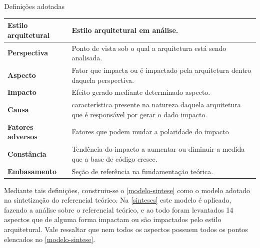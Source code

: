 \begin{quadro}
    \caption{Definições adotadas\label{quad:sintese-definicoes}}
    \begin{tabularx}{\linewidth}{ | p{5cm} | X | }
    \hline
    \textbf{Estilo arquitetural} & Estilo arquitetural em análise. \\ \hline
    \textbf{Perspectiva}         & Ponto de vista sob o qual a arquitetura está sendo analisada. \\ \hline
    \textbf{Aspecto}             & Fator que impacta ou é impactado pela arquitetura dentro daquela perspectiva. \\ \hline
    \textbf{Impacto}             & Efeito gerado mediante determinado aspecto. \\ \hline
    \textbf{Causa}               & característica presente na natureza daquela arquitetura que é responsável por gerar o dado impacto. \\ \hline
    \textbf{Fatores adversos}    & Fatores que podem mudar a polaridade do impacto \\ \hline
    \textbf{Constância}          & Tendência do impacto a aumentar ou diminuir a medida que a base de código cresce. \\ \hline
    \textbf{Embasamento}         & Seção de referência na fundamentação teórica. \\ \hline
    \end{tabularx}
\end{quadro}

Mediante tais definições, construiu-se o \autoref{modelo-sintese} como o modelo adotado na
sintetização do referencial teórico. Na \autoref{sinteses} este modelo é aplicado, fazendo a
análise sobre o referencial teórico, e ao todo foram levantados 14 aspectos que de alguma forma
impactam ou são impactados pelo estilo arquitetural. Vale ressaltar que nem todos os aspectos
possuem todos os pontos elencados no \autoref{modelo-sintese}.

